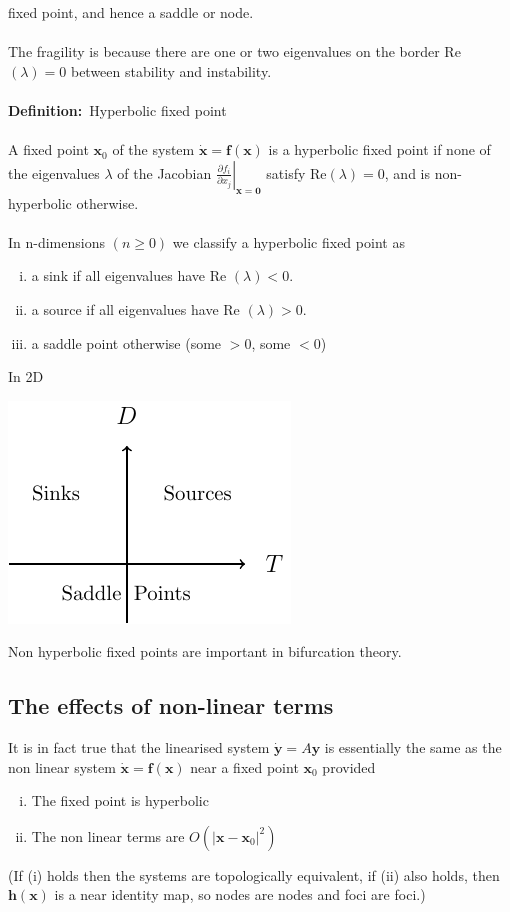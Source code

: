 \documentclass{article}
\newcommand{\definition}{\textbf{Definition:}}              %
\newcommand{\pder}[2] {\frac{\partial {#1}}{\partial {#2} }}%
\begin{document}
fixed point, and hence a saddle or node.
\\
\\
The fragility is because there are one or two eigenvalues on the border
Re$(\lambda) = 0$ between stability and instability.
\\
\\
\definition\ Hyperbolic fixed point
\\
\\
A fixed point $\bm{x}_0$ of the system $\dot{\bm{x}} = \bm{f}(\bm{x})$ is a
hyperbolic fixed point if none of the eigenvalues $\lambda$ of the Jacobian
$\displaystyle \left. \pder{f_i}{x_j} \right| _{\bm{x} = \bm{0}} $ satisfy
Re$(\lambda) = 0$, and is non-hyperbolic otherwise.
\\
\\
In n-dimensions $(n \geq 0)$ we classify a hyperbolic fixed point as
\begin{enumerate}[(i)]
\item a sink if all eigenvalues have Re $(\lambda) < 0$.
\item a source if all eigenvalues have Re $(\lambda) > 0$.
\item a saddle point otherwise (some $>0$, some $<0$)
\end{enumerate}
In 2D
\begin{center}
\includegraphics{Fig16.pdf}
\end{center}
Non hyperbolic fixed points are important in bifurcation theory.
\\
\subsection{The effects of non-linear terms}
It is in fact true that the linearised system $\dot{\bm{y}} = A \bm{y}$
is essentially the same as the non linear system $\dot{\bm{x}} = \bm{f}(\bm{x})$
near a fixed point $\bm{x}_0$ provided
\begin{enumerate}[(i)]
\item The fixed point is hyperbolic
\item The non linear terms are $O( |\bm{x} - \bm{x}_0|^2)$
\end{enumerate}
(If (i) holds then the systems are topologically equivalent, if (ii) also holds,
then $\bm{h}(\bm{x})$ is a near identity map, so nodes are nodes and foci are
foci.)
\end{document}
